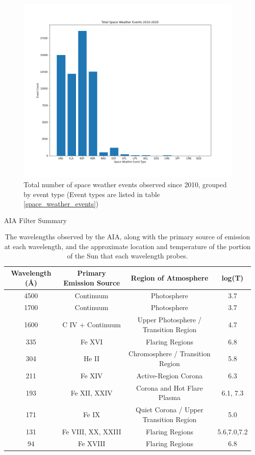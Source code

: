\documentclass[12pt, letterpaper]{article}
\begin{document}
\begin{figure}
    \includegraphics[width=12cm]{figures/Space_Weather_Plot.png}
    \centering
    \caption{Total number of space weather events observed since 2010, grouped by event type (Event types are listed in table \ref{space_weather_events})}
    \label{swe_freq}
\end{figure}

\begin{table}
\centering
\caption*{AIA Filter Summary}
\begin{tabular}{||c | c | c | c ||} 
 \hline
 Wavelength (\AA) & Primary Emission Source & Region of Atmosphere & log(T)\\ [0.5ex] 
 \hline\hline
  4500 & Continuum & Photosphere & 3.7 \\
 \hline
 1700 & Continuum & Photosphere & 3.7 \\
 \hline
 1600 & C IV + Continuum & Upper Photosphere / Transition Region & 4.7 \\
 \hline
 335 & Fe XVI & Flaring Regions & 6.8 \\
 \hline
 304 & He II & Chromosphere / Transition Region & 5.8 \\
 \hline
 211 & Fe XIV & Active-Region Corona & 6.3 \\
 \hline
 193 & Fe XII, XXIV & Corona and Hot Flare Plasma & 6.1, 7.3 \\
 \hline 
 171 & Fe IX & Quiet Corona / Upper Transition Region & 5.0 \\
 \hline
 131 & Fe VIII, XX, XXIII & Flaring Regions & 5.6,7.0,7.2 \\
 \hline
 94 & Fe XVIII & Flaring Regions & 6.8 \\
 \hline
 
\end{tabular}
\caption{The wavelengths observed by the AIA, along with the primary source of emission at each wavelength, and the approximate location and temperature of the portion of the Sun that each wavelength probes. \cite{AIA_ConceptReport}}
\label{AIA_wavelengths}
\end{table}
\end{document}
